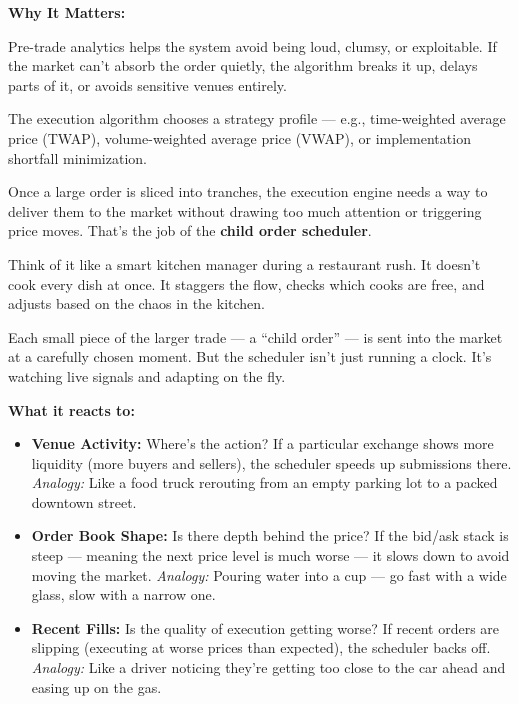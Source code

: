 \textbf{Why It Matters:}

Pre-trade analytics helps the system avoid being loud, clumsy, or exploitable.  
If the market can’t absorb the order quietly, the algorithm breaks it up, delays parts of it, or avoids sensitive venues entirely.

The execution algorithm chooses a strategy profile — e.g., time-weighted average price (TWAP), volume-weighted 
average price (VWAP), or implementation shortfall minimization.









Once a large order is sliced into tranches, the execution engine needs a way to deliver them to the market without drawing too much attention or triggering price moves. That’s the job of the \textbf{child order scheduler}.

Think of it like a smart kitchen manager during a restaurant rush.  
It doesn’t cook every dish at once. It staggers the flow, checks which cooks are free, and adjusts based on the chaos in the kitchen.

Each small piece of the larger trade — a ``child order'' — is sent into the market at a carefully chosen moment. But the scheduler isn’t just running a clock. It’s watching live signals and adapting on the fly.

\medskip

\textbf{What it reacts to:}

\begin{itemize}
  \item \textbf{Venue Activity:}  
  Where’s the action? If a particular exchange shows more liquidity (more buyers and sellers), the scheduler speeds up submissions there.  
  \textit{Analogy:} Like a food truck rerouting from an empty parking lot to a packed downtown street.

  \item \textbf{Order Book Shape:}  
  Is there depth behind the price? If the bid/ask stack is steep — meaning the next price level is much worse — it slows down to avoid moving the market.  
  \textit{Analogy:} Pouring water into a cup — go fast with a wide glass, slow with a narrow one.

  \item \textbf{Recent Fills:}  
  Is the quality of execution getting worse? If recent orders are slipping (executing at worse prices than expected), the scheduler backs off.  
  \textit{Analogy:} Like a driver noticing they’re getting too close to the car ahead and easing up on the gas.
\end{itemize}

